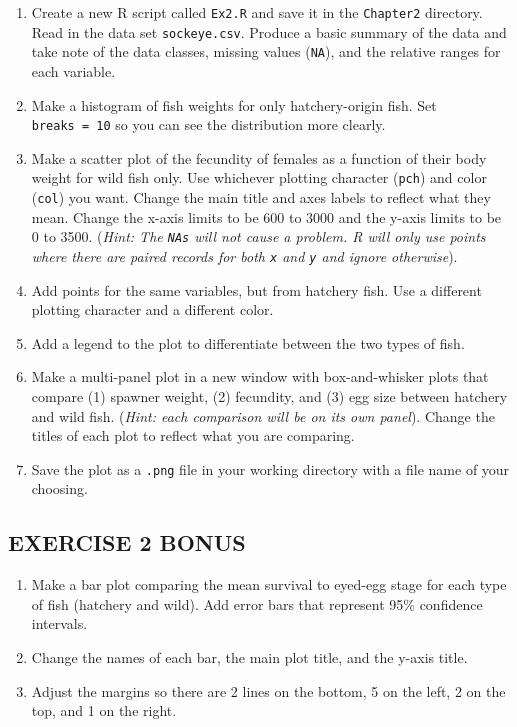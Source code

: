 \documentclass[]{book}
\providecommand{\tightlist}{%
  \setlength{\itemsep}{0pt}\setlength{\parskip}{0pt}}
\theoremstyle{definition}
\theoremstyle{definition}
\theoremstyle{definition}
\theoremstyle{remark}
\begin{document}
\begin{enumerate}
\def\labelenumi{\arabic{enumi}.}
\tightlist
\item
  Create a new R script called \texttt{Ex2.R} and save it in the
  \texttt{Chapter2} directory. Read in the data set
  \texttt{sockeye.csv}. Produce a basic summary of the data and take
  note of the data classes, missing values (\texttt{NA}), and the
  relative ranges for each variable.
\item
  Make a histogram of fish weights for only hatchery-origin fish. Set
  \texttt{breaks\ =\ 10} so you can see the distribution more clearly.
\item
  Make a scatter plot of the fecundity of females as a function of their
  body weight for wild fish only. Use whichever plotting character
  (\texttt{pch}) and color (\texttt{col}) you want. Change the main
  title and axes labels to reflect what they mean. Change the x-axis
  limits to be 600 to 3000 and the y-axis limits to be 0 to 3500.
  (\emph{Hint: The \texttt{NAs} will not cause a problem. R will only
  use points where there are paired records for both \texttt{x} and
  \texttt{y} and ignore otherwise}).
\item
  Add points for the same variables, but from hatchery fish. Use a
  different plotting character and a different color.
\item
  Add a legend to the plot to differentiate between the two types of
  fish.\\
\item
  Make a multi-panel plot in a new window with box-and-whisker plots
  that compare (1) spawner weight, (2) fecundity, and (3) egg size
  between hatchery and wild fish. (\emph{Hint: each comparison will be
  on its own panel}). Change the titles of each plot to reflect what you
  are comparing.
\item
  Save the plot as a \texttt{.png} file in your working directory with a
  file name of your choosing.
\end{enumerate}

\subsection*{EXERCISE 2 BONUS}\label{exercise-2-bonus}

\begin{enumerate}
\def\labelenumi{\arabic{enumi}.}
\tightlist
\item
  Make a bar plot comparing the mean survival to eyed-egg stage for each
  type of fish (hatchery and wild). Add error bars that represent 95\%
  confidence intervals.
\item
  Change the names of each bar, the main plot title, and the y-axis
  title.\\
\item
  Adjust the margins so there are 2 lines on the bottom, 5 on the left,
  2 on the top, and 1 on the right.
\end{enumerate}
\end{document}
